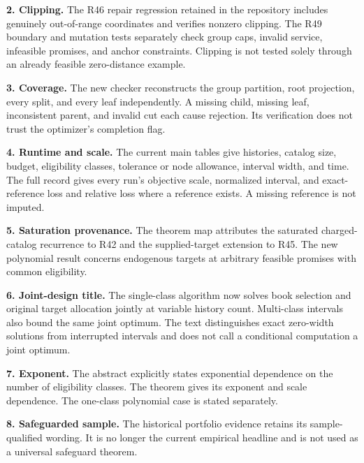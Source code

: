 \documentclass[11pt,letterpaper]{article}
\begin{document}
\textbf{2. Clipping.} The R46 repair regression retained in the repository includes genuinely out-of-range coordinates and verifies nonzero clipping. The R49 boundary and mutation tests separately check group caps, invalid service, infeasible promises, and anchor constraints. Clipping is not tested solely through an already feasible zero-distance example.



\textbf{3. Coverage.} The new checker reconstructs the group partition, root projection, every split, and every leaf independently. A missing child, missing leaf, inconsistent parent, and invalid cut each cause rejection. Its verification does not trust the optimizer's completion flag.



\textbf{4. Runtime and scale.} The current main tables give histories, catalog size, budget, eligibility classes, tolerance or node allowance, interval width, and time. The full record gives every run's objective scale, normalized interval, and exact-reference loss and relative loss where a reference exists. A missing reference is not imputed.



\textbf{5. Saturation provenance.} The theorem map attributes the saturated charged-catalog recurrence to R42 and the supplied-target extension to R45. The new polynomial result concerns endogenous targets at arbitrary feasible promises with common eligibility.



\textbf{6. Joint-design title.} The single-class algorithm now solves book selection and original target allocation jointly at variable history count. Multi-class intervals also bound the same joint optimum. The text distinguishes exact zero-width solutions from interrupted intervals and does not call a conditional computation a joint optimum.



\textbf{7. Exponent.} The abstract explicitly states exponential dependence on the number of eligibility classes. The theorem gives its exponent and scale dependence. The one-class polynomial case is stated separately.



\textbf{8. Safeguarded sample.} The historical portfolio evidence retains its sample-qualified wording. It is no longer the current empirical headline and is not used as a universal safeguard theorem.
\end{document}
